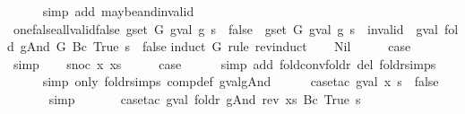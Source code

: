 \begin{isabellebody}
\ \ \ \ \isamarkupfalse%
\ {\isacharparenleft}simp\ add{\isacharcolon}\ maybe{\isacharunderscore}and{\isacharunderscore}invalid{\isacharparenright}\isanewline
{}\isamarkupfalse%
%
\endisatagproof
{\isafoldproof}%
%
\isadelimproof
\isanewline
%
\endisadelimproof
\isanewline
{}\isamarkupfalse%
\ one{\isacharunderscore}false{\isacharunderscore}all{\isacharunderscore}valid{\isacharunderscore}false{\isacharcolon}\ {\isachardoublequoteopen}{\isasymexists}g{\isasymin}set\ G{\isachardot}\ gval\ g\ s\ {\isacharequal}\ false\ {\isasymLongrightarrow}\ {\isasymforall}g{\isasymin}set\ G{\isachardot}\ gval\ g\ s\ {\isasymnoteq}\ invalid\ {\isasymLongrightarrow}\ gval\ {\isacharparenleft}fold\ gAnd\ G\ {\isacharparenleft}Bc\ True{\isacharparenright}{\isacharparenright}\ s\ {\isacharequal}\ false{\isachardoublequoteclose}\isanewline
%
\isadelimproof
%
\endisadelimproof
%
\isatagproof
{}\isamarkupfalse%
{\isacharparenleft}induct\ G\ rule{\isacharcolon}\ rev{\isacharunderscore}induct{\isacharparenright}\isanewline
\ \ \isamarkupfalse%
\ Nil\isanewline
\ \ \isamarkupfalse%
\ \isamarkupfalse%
\ {\isacharquery}case\isanewline
\ \ \ \ \isamarkupfalse%
\ simp\isanewline
{}\isamarkupfalse%
\isanewline
\ \ \isamarkupfalse%
\ {\isacharparenleft}snoc\ x\ xs{\isacharparenright}\isanewline
\ \ \isamarkupfalse%
\ \isamarkupfalse%
\ {\isacharquery}case\isanewline
\ \ \ \ \isamarkupfalse%
\ {\isacharparenleft}simp\ add{\isacharcolon}\ fold{\isacharunderscore}conv{\isacharunderscore}foldr\ del{\isacharcolon}\ foldr{\isachardot}simps{\isacharparenright}\isanewline
\ \ \ \ \isamarkupfalse%
\ {\isacharparenleft}simp\ only{\isacharcolon}\ foldr{\isachardot}simps\ comp{\isacharunderscore}def\ gval{\isacharunderscore}gAnd{\isacharparenright}\isanewline
\ \ \ \ \isamarkupfalse%
\ {\isacharparenleft}case{\isacharunderscore}tac\ {\isachardoublequoteopen}gval\ x\ s\ {\isacharequal}\ false{\isachardoublequoteclose}{\isacharparenright}\isanewline
\ \ \ \ \ \isamarkupfalse%
\ simp\isanewline
\ \ \ \ \ \isamarkupfalse%
\ {\isacharparenleft}case{\isacharunderscore}tac\ {\isachardoublequoteopen}gval\ {\isacharparenleft}foldr\ gAnd\ {\isacharparenleft}rev\ xs{\isacharparenright}\ {\isacharparenleft}Bc\ True{\isacharparenright}{\isacharparenright}\ s{\isachardoublequoteclose}{\isacharparenright}\isanewline
\ \ \ \ \ \ \ \isamarkupfalse%

\end{isabellebody}
